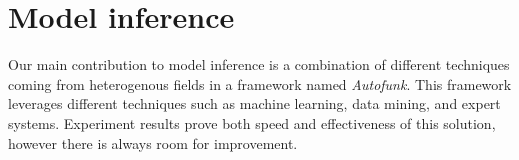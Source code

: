 \section{Model inference}
\label{sec:conclusion:modelinf}

Our main contribution to model inference is a combination of
different techniques coming from heterogenous fields in a
framework named \textit{Autofunk}. This framework leverages different
techniques such as machine learning, data mining, and expert
systems. Experiment results prove both speed and effectiveness of
this solution, however there is always room for improvement.

